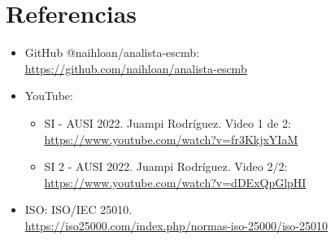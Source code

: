 \hypertarget{referencias}{%
\section{Referencias}\label{referencias}}

\begin{itemize}
\item
  GitHub @naihloan/analista-escmb: \\
  \url{https://github.com/naihloan/analista-escmb}
\item
  YouTube:

  \begin{itemize}
  \item
    SI - AUSI 2022. Juampi Rodríguez. Video 1 de 2: \\
    \url{https://www.youtube.com/watch?v=fr3KkjxYIaM}
  \item
    SI 2 - AUSI 2022. Juampi Rodríguez. Video 2/2: \\
    \url{https://www.youtube.com/watch?v=dDExQpGlpHI}
  \end{itemize}
\item
  ISO: ISO/IEC 25010. \\
  \url{https://iso25000.com/index.php/normas-iso-25000/iso-25010}
\end{itemize}

\onecolumn
